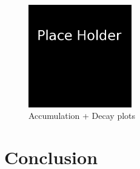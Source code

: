 \documentclass[letterpaper,twocolumn]{article}
\begin{document}
\begin{figure}[htbp]
\begin{center}
\includegraphics[width=0.4\textwidth]{figures/place_holder}
\caption{Accumulation + Decay plots}
\label{accum_decay}
\end{center}
\end{figure}

\section*{Conclusion}

{}

\end{document}
